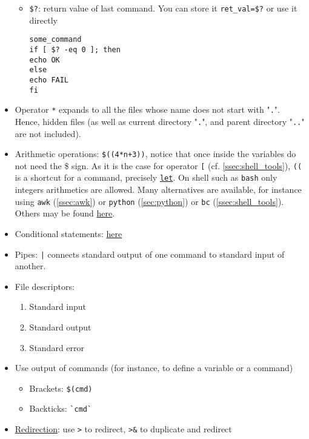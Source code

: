 \documentclass[a4paper,12pt,%
              final%
              ]{article}
\begin{document}
\begin{itemize}
\begin{itemize}
      \item \verb|$?|: return value of last command. You can store it \verb|ret_val=$?| or use it directly
\begin{verbatim}
some_command
if [ $? -eq 0 ]; then
echo OK
else
echo FAIL
fi
\end{verbatim}
    \end{itemize}
  \item Operator \texttt{*} expands to all the files whose name does not start with "\texttt{.}". Hence, hidden files (as well as current directory "\texttt{.}", and parent directory "\texttt{..}" are not included).
  \item Arithmetic operations: \verb|$((4*n+3))|, notice that once inside the variables do not need the \$ sign. As it is the case for operator \verb|[| (cf. \autoref{ssec:shell_tools}), \verb|((| is a shortcut for a command, precisely \href{https://www.computerhope.com/unix/bash/let.htm}{\texttt{let}}. On shell such as \texttt{bash} only integers arithmetics are allowed. Many alternatives are available, for instance using \texttt{awk} (\autoref{ssec:awk}) or \texttt{python} (\autoref{sec:python}) or \texttt{bc} (\autoref{ssec:shell_tools}). Others may be found \href{https://unix.stackexchange.com/questions/40786/how-to-do-integer-float-calculations-in-bash-or-other-languages-frameworks}{here}.
  \item Conditional statements: \href{https://unix.stackexchange.com/questions/306111/what-is-the-difference-between-the-bash-operators-vs-vs-vs}{here}
  \item Pipes: \verb!|! connects standard output of one command to standard input of another.
  \item File descriptors:
    \begin{enumerate}[start=0,label={\texttt{\arabic*} :}]
      \item Standard input
      \item Standard output
      \item Standard error
    \end{enumerate}
  \item Use output of commands (for instance, to define a variable or a command)
    \begin{itemize}
      \item Brackets: \verb|$(cmd)|
      \item Backticks: \verb|`cmd`|
    \end{itemize}
  \item \href{https://www.gnu.org/software/bash/manual/bash.html#Redirections}{Redirection}: use \verb|>| to redirect, \verb|>&| to duplicate and redirect

\end{itemize}
\end{document}
